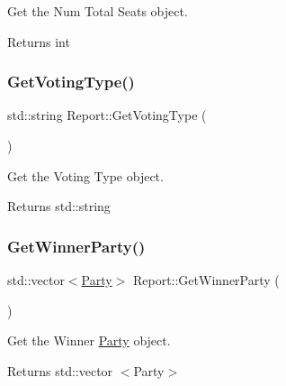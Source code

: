 Get the Num Total Seats object. 

\begin{DoxyReturn}{Returns}
int 
\end{DoxyReturn}
\mbox{\label{classReport_aaa2157ab3c123a4b9aa4e02f327cba08}} 
\subsubsection{\texorpdfstring{Get\+Voting\+Type()}{GetVotingType()}}
{\footnotesize\ttfamily std\+::string Report\+::\+Get\+Voting\+Type (\begin{DoxyParamCaption}{ }\end{DoxyParamCaption})\hspace{0.3cm}{\ttfamily [inline]}}



Get the Voting Type object. 

\begin{DoxyReturn}{Returns}
std\+::string 
\end{DoxyReturn}
\mbox{\label{classReport_a615da7011e9370130181f8d24fa001d6}} 
\subsubsection{\texorpdfstring{Get\+Winner\+Party()}{GetWinnerParty()}}
{\footnotesize\ttfamily std\+::vector$<$\hyperlink{classParty}{Party}$>$ Report\+::\+Get\+Winner\+Party (\begin{DoxyParamCaption}{ }\end{DoxyParamCaption})\hspace{0.3cm}{\ttfamily [inline]}}



Get the Winner \hyperlink{classParty}{Party} object. 

\begin{DoxyReturn}{Returns}
std\+::vector $<$\+Party$>$ 
\end{DoxyReturn}
\mbox{\label{classReport_ac860bc2e03f18c6787c92680cf48e944}} 
